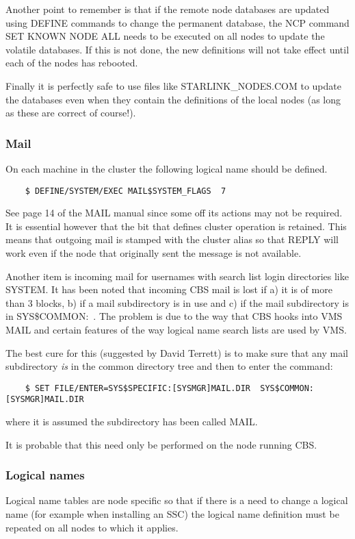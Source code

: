 \begin {itemize}
Another point to remember is that if the remote node databases are updated
using DEFINE commands to change the permanent database, the NCP command
SET KNOWN NODE ALL needs to be executed on all nodes to update the volatile
databases.
If this is not done, the new definitions will not take effect until each of
the nodes has rebooted.

Finally it is perfectly safe to use files like STARLINK\_NODES.COM to update
the databases even when they contain the definitions of the local nodes
(as long as these are correct of course!).

\end {itemize}

\subsubsection {Mail}
On each machine in the cluster the following logical name should be defined.
\begin{verbatim}
    $ DEFINE/SYSTEM/EXEC MAIL$SYSTEM_FLAGS  7
\end{verbatim}
See page 14 of the MAIL manual since some off its actions may not be required.
It is essential however that the bit that defines cluster operation is retained.
This means that outgoing mail is stamped with the cluster alias so that REPLY
will work even if the node that originally sent the message is not available.

Another item is incoming mail for usernames with search list login directories
like SYSTEM.
It has been noted that incoming CBS mail is lost if a) it is of more than 3
blocks,  b) if a mail subdirectory is in use and c) if the mail subdirectory
is in SYS\$COMMON:~.
The problem is due to the way that CBS hooks into VMS MAIL and certain features
of the way logical name search lists are used by VMS.

The best cure for this (suggested by David Terrett) is to make sure that
any mail subdirectory {\em is} in the common directory tree and then to
enter the command:
\begin{verbatim}
    $ SET FILE/ENTER=SYS$SPECIFIC:[SYSMGR]MAIL.DIR  SYS$COMMON:[SYSMGR]MAIL.DIR
\end{verbatim}
where it is assumed the subdirectory has been called MAIL.

It is probable that this need only be performed on the node running CBS.

\subsubsection {Logical names}
Logical name tables are node specific so that if there is a need to change a
logical name (for example when installing an SSC) the logical name definition
must be repeated on all nodes to which it applies.

